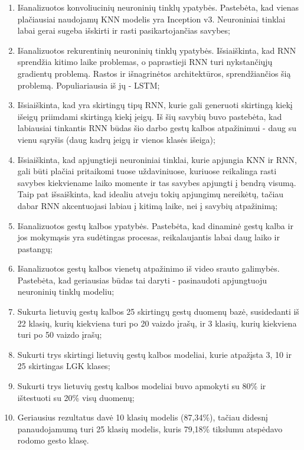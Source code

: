 \documentclass{VUMIFPSbakalaurinis}
\begin{document}
\begin{enumerate}
	\item Išanalizuotos konvoliucinių neuroninių tinklų ypatybės. Pastebėta, kad vienas plačiausiai naudojamų KNN modelis yra Inception v3. Neuroniniai tinklai labai gerai sugeba išskirti ir rasti pasikartojančias savybes;
	\item Išanalizuotos rekurentinių neuroninių tinklų ypatybės. Išsiaiškinta, kad RNN sprendžia kitimo laike problemas, o paprastieji RNN turi nykstančiųjų gradientų problemą. Rastos ir išnagrinėtos architektūros, sprendžiančios šią problemą. Populiariausia iš jų - LSTM;
	\item Išsiaiškinta, kad yra skirtingų tipų RNN, kurie gali generuoti skirtingą kiekį išeigų priimdami skirtingą kiekį įeigų. Iš šių savybių buvo pastebėta, kad labiausiai tinkantis RNN būdas šio darbo gestų kalbos atpažinimui - daug su vienu sąryšis (daug kadrų įeigų ir vienos klasės išeiga); 
	\item Išsiaiškinta, kad apjungtieji neuroniniai tinklai, kurie apjungia KNN ir RNN, gali būti plačiai pritaikomi tuose uždaviniuose, kuriuose reikalinga rasti savybes kiekviename laiko momente ir tas savybes apjungti į bendrą visumą. Taip pat išsaiškinta, kad idealiu atveju tokių apjungimų nereikėtų, tačiau dabar RNN akcentuojasi labiau į kitimą laike, nei į savybių atpažinimą;
	\item Išanalizuotos gestų kalbos ypatybės. Pastebėta, kad dinaminė gestų kalba ir jos mokymąsis yra sudėtingas procesas, reikalaujantis labai daug laiko ir pastangų;
	\item Išanalizuotos gestų kalbos vienetų atpažinimo iš video srauto galimybės. Pastebėta, kad geriausias būdas tai daryti - pasinaudoti apjungtuoju neuroninių tinklų modeliu;
	\item Sukurta lietuvių gestų kalbos 25 skirtingų gestų duomenų bazė, susidedanti iš 22 klasių, kurių kiekviena turi po 20 vaizdo įrašų, ir 3 klasių, kurių kiekviena turi po 50 vaizdo įrašų;
	\item Sukurti trys skirtingi lietuvių gestų kalbos modeliai, kurie atpažįsta 3, 10 ir 25 skirtingas LGK klases;
	\item Sukurti trys lietuvių gestų kalbos modeliai buvo apmokyti su 80\% ir ištestuoti su 20\% visų duomenų;
	\item Geriausius rezultatus davė 10 klasių modelis (87,34\%), tačiau didesnį panaudojamumą turi 25 klasių modelis, kuris 79,18\% tikslumu  atspėdavo rodomo gesto klasę.
\end{enumerate}
\end{document}
